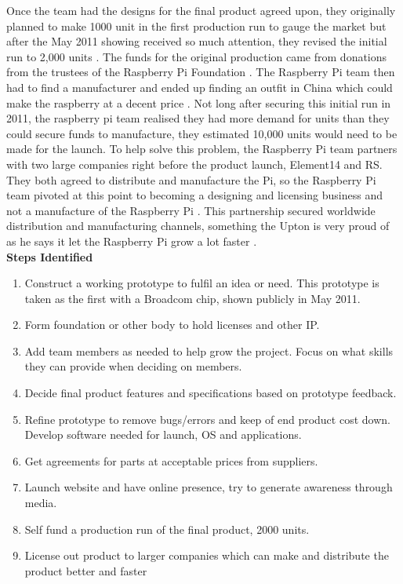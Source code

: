 Once the team had the designs for the final product agreed upon, they originally planned to make 1000 unit in the first production run to gauge the market
\cite{RN139} but after the May 2011 showing received so much attention, they revised the initial run to 2,000 units 
\cite{RN98}. The funds for the original production came from donations from the trustees of the Raspberry Pi Foundation 
\cite{RN142}. The Raspberry Pi team then had to find a manufacturer and ended up finding an outfit in China which could make the raspberry at a decent price 
\cite{RN98}. Not long after securing this initial run in 2011, the raspberry pi team realised they had more demand for units than they could secure funds to manufacture, they estimated 10,000 units would need to be made for the launch. To help solve this problem, the Raspberry Pi team partners with two large companies right before the product launch, Element14 and RS. They both agreed to distribute and manufacture the Pi, so the Raspberry Pi team pivoted at this point to becoming a designing and licensing business and not a manufacture of the Raspberry Pi 
\cite{RN98}. This partnership secured worldwide distribution and manufacturing channels, something the Upton is very proud of as he says it let the Raspberry Pi grow a lot faster 
\cite{RN98}.\\

\textbf{Steps Identified}
\begin{enumerate}
\item Construct a working prototype to fulfil an idea or need. This prototype is taken as the first with a Broadcom chip, shown publicly in May 2011.
\item Form foundation or other body to hold licenses and other IP.
\item Add team members as needed to help grow the project. Focus on what skills they can provide when deciding on members.
\item Decide final product features and specifications based on prototype feedback.
\item Refine prototype to remove bugs/errors and keep of end product cost down. Develop software needed for launch, OS and applications.
\item Get agreements for parts at acceptable prices from suppliers.
\item Launch website and have online presence, try to generate awareness through media.
\item Self fund a production run of the final product, 2000 units.
\item License out product to larger companies which can make and distribute the product better and faster
\end{enumerate} 
 
